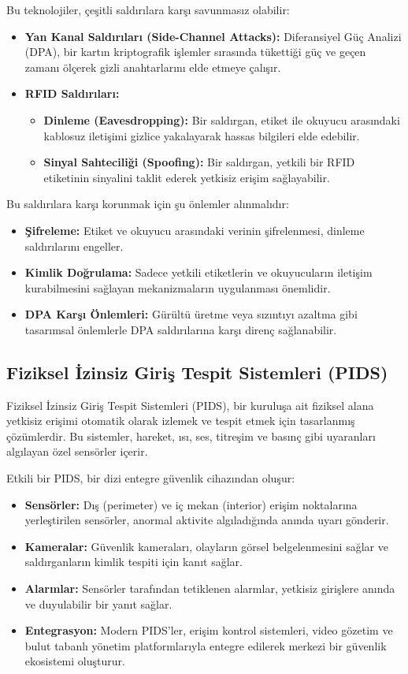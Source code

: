 Bu teknolojiler, çeşitli saldırılara karşı savunmasız olabilir:
\begin{itemize}
    \item \textbf{Yan Kanal Saldırıları (Side-Channel Attacks):} Diferansiyel Güç Analizi (DPA), bir kartın kriptografik işlemler sırasında tükettiği güç ve geçen zamanı ölçerek gizli anahtarlarını elde etmeye çalışır.
    \item \textbf{RFID Saldırıları:}
    \begin{itemize}
        \item \textbf{Dinleme (Eavesdropping):} Bir saldırgan, etiket ile okuyucu arasındaki kablosuz iletişimi gizlice yakalayarak hassas bilgileri elde edebilir.
        \item \textbf{Sinyal Sahteciliği (Spoofing):} Bir saldırgan, yetkili bir RFID etiketinin sinyalini taklit ederek yetkisiz erişim sağlayabilir.
    \end{itemize}
\end{itemize}
Bu saldırılara karşı korunmak için şu önlemler alınmalıdır:
\begin{itemize}
    \item \textbf{Şifreleme:} Etiket ve okuyucu arasındaki verinin şifrelenmesi, dinleme saldırılarını engeller.
    \item \textbf{Kimlik Doğrulama:} Sadece yetkili etiketlerin ve okuyucuların iletişim kurabilmesini sağlayan mekanizmaların uygulanması önemlidir.
    \item \textbf{DPA Karşı Önlemleri:} Gürültü üretme veya sızıntıyı azaltma gibi tasarımsal önlemlerle DPA saldırılarına karşı direnç sağlanabilir.
\end{itemize}

\subsection{Fiziksel İzinsiz Giriş Tespit Sistemleri (PIDS)}

Fiziksel İzinsiz Giriş Tespit Sistemleri (PIDS), bir kuruluşa ait fiziksel alana yetkisiz erişimi otomatik olarak izlemek ve tespit etmek için tasarlanmış çözümlerdir. Bu sistemler, hareket, ısı, ses, titreşim ve basınç gibi uyaranları algılayan özel sensörler içerir.

Etkili bir PIDS, bir dizi entegre güvenlik cihazından oluşur:
\begin{itemize}
    \item \textbf{Sensörler:} Dış (perimeter) ve iç mekan (interior) erişim noktalarına yerleştirilen sensörler, anormal aktivite algıladığında anında uyarı gönderir.
    \item \textbf{Kameralar:} Güvenlik kameraları, olayların görsel belgelenmesini sağlar ve saldırganların kimlik tespiti için kanıt sağlar.
    \item \textbf{Alarmlar:} Sensörler tarafından tetiklenen alarmlar, yetkisiz girişlere anında ve duyulabilir bir yanıt sağlar.
    \item \textbf{Entegrasyon:} Modern PIDS'ler, erişim kontrol sistemleri, video gözetim ve bulut tabanlı yönetim platformlarıyla entegre edilerek merkezi bir güvenlik ekosistemi oluşturur.
\end{itemize}


